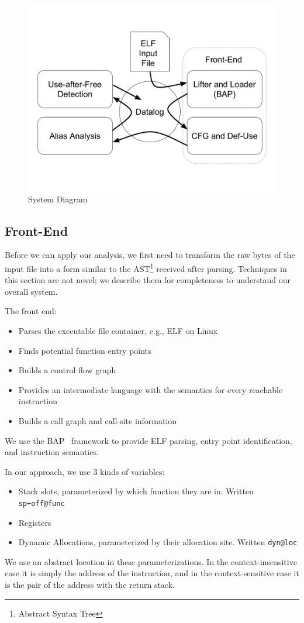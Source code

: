 \begin{figure}
	\centering\includegraphics[scale=0.3]{alias/system.pdf}
	\caption{System Diagram}
	\label{fig:system}
\end{figure}

\subsection{Front-End}
Before we can apply our analysis, we first need to transform the raw
bytes of the input file into a form similar to the AST\footnote{Abstract Syntax Tree} received after
parsing.
Techniques in this section are not novel; we describe them for completeness to understand our overall system.

The front end:
\begin{itemize}
  \item Parses the executable file container, e.g., ELF on Linux
  \item Finds potential function entry points
  \item Builds a control flow graph
  \item Provides an intermediate language with the semantics for every reachable instruction
  \item Builds a call graph and call-site information
\end{itemize}

We use the BAP~\cite{bap} framework to provide ELF parsing, entry point identification, and instruction semantics.

In our approach, we use 3 kinds of variables:
\begin{itemize}
	\item Stack slots, parameterized by which function they are in. Written \texttt{sp+off@func}
	\item Registers
	\item Dynamic Allocations, parameterized by their allocation site. Written \texttt{dyn@loc}
\end{itemize}
We use an abstract location in these parameterizations.
In the context-insensitive case it is simply the address of the instruction, and in the context-sensitive case it is the pair of the address with the return stack.

